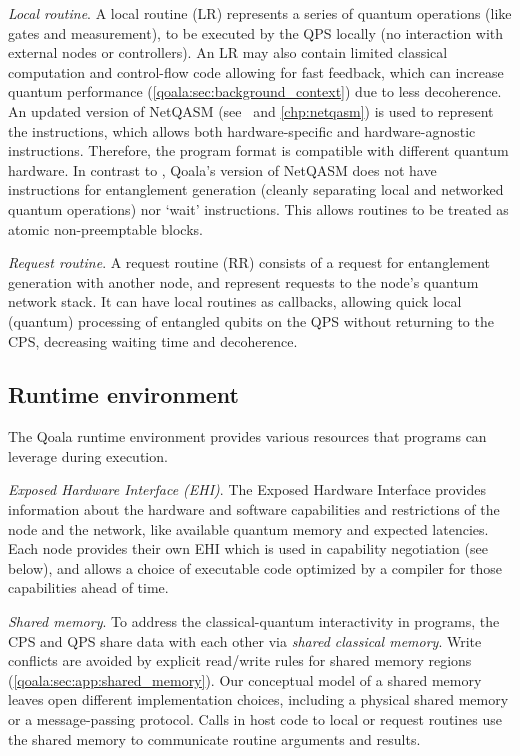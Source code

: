 \textit{Local routine}.
A local routine (LR) represents a series of quantum operations (like gates and measurement), to be executed by the QPS locally (no interaction with external nodes or controllers).
An LR may also contain limited classical computation and control-flow code allowing for fast feedback, which can increase quantum performance (\cref{qoala:sec:background_context}) due to less decoherence.
An updated version of NetQASM (see~\cite{dahlberg2022netqasm} and \cref{chp:netqasm}) is used to represent the instructions, which allows both hardware-specific and hardware-agnostic instructions.
Therefore, the program format is compatible with different quantum hardware.
In contrast to \cite{dahlberg2022netqasm}, Qoala's version of NetQASM does not have instructions for entanglement generation (cleanly separating local and networked quantum operations)
nor `wait' instructions. This allows routines to be treated as atomic non-preemptable blocks.

\textit{Request routine}. A request routine (RR) consists of a request for entanglement generation with another node, and represent requests to the node's quantum network stack.
It can have local routines as callbacks, allowing quick local (quantum) processing of entangled qubits on the QPS without returning to the CPS, decreasing waiting time and decoherence.


\subsection{Runtime environment}
\label{qoala:sec:runtime_environment}
The Qoala runtime environment provides various resources that programs can leverage during execution.

\textit{Exposed Hardware Interface (EHI)}.
The Exposed Hardware Interface provides information about the hardware and software capabilities and restrictions of the node and the network,
like available quantum memory and expected latencies.
Each node provides their own EHI which is used in capability negotiation (see below), and allows a choice of executable code optimized by a compiler for those capabilities ahead of time. 

\textit{Shared memory}.
To address the classical-quantum interactivity in programs, the CPS and QPS share data with each other via \textit{shared classical memory}.
Write conflicts are avoided by explicit read/write rules for shared memory regions (\cref{qoala:sec:app:shared_memory}).
Our conceptual model of a shared memory leaves open different implementation choices, including a physical shared memory or a message-passing protocol.
Calls in host code to local or request routines use the shared memory to communicate routine arguments and results.

